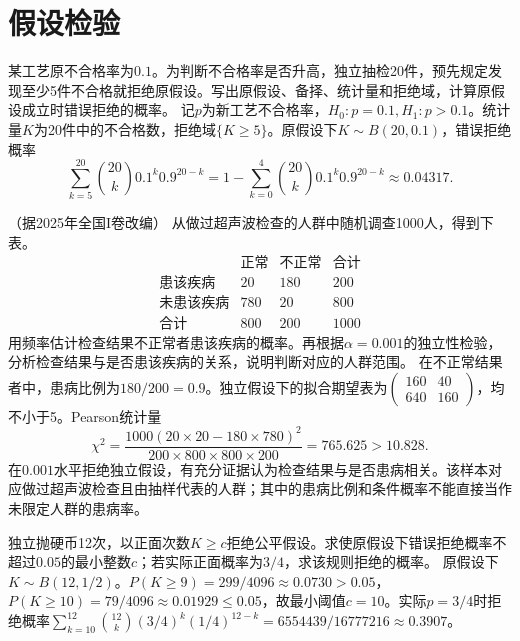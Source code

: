 \par\addvspace{12pt}

\section{假设检验}

某工艺原不合格率为\(0.1\)。为判断不合格率是否升高，独立抽检20件，预先规定发现至少5件不合格就拒绝原假设。写出原假设、备择、统计量和拒绝域，计算原假设成立时错误拒绝的概率。
\solutionanswer
记\(p\)为新工艺不合格率，\(H_0:p=0.1,H_1:p>0.1\)。统计量\(K\)为20件中的不合格数，拒绝域\(\{K\ge5\}\)。原假设下\(K\sim B(20,0.1)\)，错误拒绝概率
\[
 \sum_{k=5}^{20}\binom{20}k0.1^k0.9^{20-k}
 =1-\sum_{k=0}^4\binom{20}k0.1^k0.9^{20-k}\approx0.04317.
\]


（据2025年全国I卷改编）
从做过超声波检查的人群中随机调查1000人，得到下表。
\[
\begin{array}{c|rr|r}
 &\text{正常}&\text{不正常}&\text{合计}\\\hline
 \text{患该疾病}&20&180&200\\
 \text{未患该疾病}&780&20&800\\\hline
 \text{合计}&800&200&1000
\end{array}
\]
用频率估计检查结果不正常者患该疾病的概率。再根据\(\alpha=0.001\)的独立性检验，分析检查结果与是否患该疾病的关系，说明判断对应的人群范围。
\solutionanswer
在不正常结果者中，患病比例为\(180/200=0.9\)。独立假设下的拟合期望表为\(\left(\begin{smallmatrix}160&40\\640&160\end{smallmatrix}\right)\)，均不小于5。Pearson统计量
\[
 \chi^2=\frac{1000(20\times20-180\times780)^2}{200\times800\times800\times200}=765.625>10.828.
\]
在\(0.001\)水平拒绝独立假设，有充分证据认为检查结果与是否患病相关。该样本对应做过超声波检查且由抽样代表的人群；其中的患病比例和条件概率不能直接当作未限定人群的患病率。


独立抛硬币12次，以正面次数\(K\ge c\)拒绝公平假设。求使原假设下错误拒绝概率不超过\(0.05\)的最小整数\(c\)；若实际正面概率为\(3/4\)，求该规则拒绝的概率。
\solutionanswer
原假设下\(K\sim B(12,1/2)\)。\(P(K\ge9)=299/4096\approx0.0730>0.05\)，\(P(K\ge10)=79/4096\approx0.01929\le0.05\)，故最小阈值\(c=10\)。实际\(p=3/4\)时拒绝概率\(\sum_{k=10}^{12}\binom{12}k(3/4)^k(1/4)^{12-k}=6554439/16777216\approx0.3907\)。



